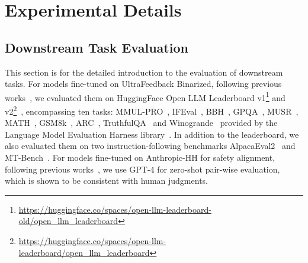 \section{Experimental Details}
\subsection{Downstream Task Evaluation}
\label{app:task-eval}
This section is for the detailed introduction to the evaluation of downstream tasks.
For models fine-tuned on UltraFeedback Binarized, following previous works~\citep{rafailov2024direct,tunstall2023zephyr}, we evaluated them on HuggingFace Open LLM Leaderboard v1\footnote{\url{https://huggingface.co/spaces/open-llm-leaderboard-old/open_llm_leaderboard}} and v2\footnote{\url{https://huggingface.co/spaces/open-llm-leaderboard/open_llm_leaderboard}}~\citep{open-llm-leaderboard-v1,open-llm-leaderboard-v2}, encompassing ten tasks: 
MMUL-PRO~\citep{wang2024mmluprorobustchallengingmultitask}, IFEval~\citep{zhou2023instructionfollowingevaluationlargelanguage}, BBH~\citep{suzgun2022challengingbigbenchtaskschainofthought}, GPQA~\citep{rein2023gpqagraduatelevelgoogleproofqa}, MUSR~\citep{sprague2024musrtestinglimitschainofthought}, MATH~\citep{hendrycks2021measuringmathematicalproblemsolving}, GSM8k~\citep{cobbe2021training}, ARC~\citep{clark2018think}, 
TruthfulQA~\citep{lin-etal-2022-truthfulqa} and Winogrande~\citep{sakaguchi2021winogrande} provided by the Language Model Evaluation Harness library~\citep{eval-harness}.
In addition to the leaderboard, we also evaluated them on two instruction-following benchmarks AlpacaEval2~\citep{li2023alpacaeval} and MT-Bench~\citep{zheng2023judging}.
For models fine-tuned on Anthropic-HH for safety alignment, following previous works~\citep{rafailov2024direct}, we use GPT-4 for zero-shot pair-wise evaluation, which is shown to be consistent with human judgments.



